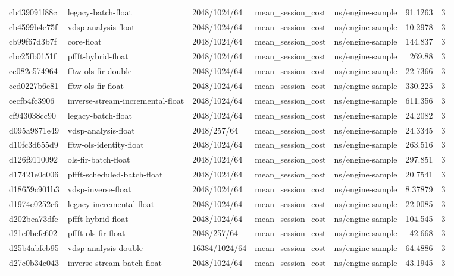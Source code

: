 \begin{longtable}{lllllrr}
cb439091f88c & legacy-batch-float & 2048/1024/64 & mean\_session\_cost & ns/engine-sample & 91.1263 & 3 \\
cb4599b4e75f & vdsp-analysis-float & 2048/1024/64 & mean\_session\_cost & ns/engine-sample & 10.2978 & 3 \\
cb99f67d3b7f & core-float & 2048/1024/64 & mean\_session\_cost & ns/engine-sample & 144.837 & 3 \\
cbc25fb0151f & pffft-hybrid-float & 2048/1024/64 & mean\_session\_cost & ns/engine-sample & 269.88 & 3 \\
cc082c574964 & fftw-ols-fir-double & 2048/1024/64 & mean\_session\_cost & ns/engine-sample & 22.7366 & 3 \\
ccd0227b6e81 & fftw-ols-fir-float & 2048/1024/64 & mean\_session\_cost & ns/engine-sample & 330.225 & 3 \\
cecfb4fc3906 & inverse-stream-incremental-float & 2048/1024/64 & mean\_session\_cost & ns/engine-sample & 611.356 & 3 \\
cf943038cc90 & legacy-batch-float & 2048/1024/64 & mean\_session\_cost & ns/engine-sample & 24.2082 & 3 \\
d095a9871e49 & vdsp-analysis-float & 2048/257/64 & mean\_session\_cost & ns/engine-sample & 24.3345 & 3 \\
d10fc3d655d9 & fftw-ols-identity-float & 2048/1024/64 & mean\_session\_cost & ns/engine-sample & 263.516 & 3 \\
d126f9110092 & ols-fir-batch-float & 2048/1024/64 & mean\_session\_cost & ns/engine-sample & 297.851 & 3 \\
d17421e0c006 & pffft-scheduled-batch-float & 2048/1024/64 & mean\_session\_cost & ns/engine-sample & 20.7541 & 3 \\
d18659c901b3 & vdsp-inverse-float & 2048/1024/64 & mean\_session\_cost & ns/engine-sample & 8.37879 & 3 \\
d1974e0252c6 & legacy-incremental-float & 2048/1024/64 & mean\_session\_cost & ns/engine-sample & 22.0085 & 3 \\
d202bea73dfe & pffft-hybrid-float & 2048/1024/64 & mean\_session\_cost & ns/engine-sample & 104.545 & 3 \\
d21e0befc602 & pffft-ols-fir-float & 2048/257/64 & mean\_session\_cost & ns/engine-sample & 42.668 & 3 \\
d25b4abfeb95 & vdsp-analysis-double & 16384/1024/64 & mean\_session\_cost & ns/engine-sample & 64.4886 & 3 \\
d27c0b34c043 & inverse-stream-batch-float & 2048/1024/64 & mean\_session\_cost & ns/engine-sample & 43.1945 & 3 \\

\end{longtable}
